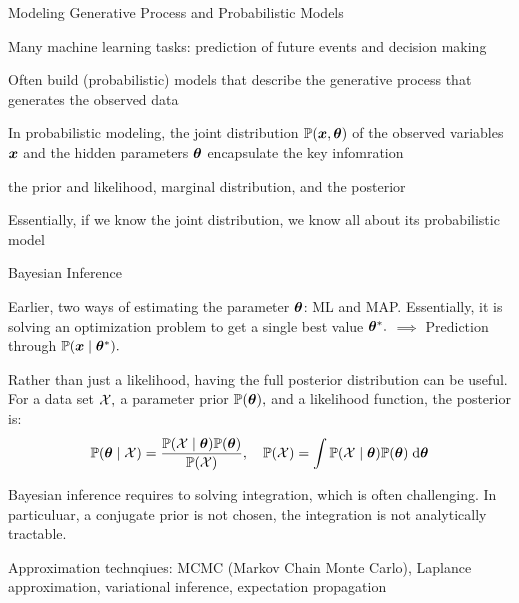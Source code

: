 \documentclass[handout,fleqn,aspectratio=169]{beamer}
\begin{document}
\begin{frame}{Modeling Generative Process and Probabilistic Models}

\plitemsep 0.2in

\bci 

\item Many machine learning tasks: prediction of future events and decision making

\item Often build (probabilistic) models that describe the generative process that generates the observed data

\item In probabilistic modeling, the joint distribution $\mathbb{P}( \bm{x},\bm{\theta} )$ of the observed variables 
$\bm{x}$ and the hidden parameters $\bm{\theta}$ encapsulate the key infomration
\bci
\item the prior and likelihood, marginal distribution, and the posterior 
\eci

\item Essentially, if we know the joint distribution, we know all about its probabilistic model
\eci
\end{frame}

\begin{frame}{Bayesian Inference}

\plitemsep 0.05in

\bci 

\item Earlier, two ways of estimating the parameter $\bm{\theta}$: ML and MAP. Essentially, it is solving an optimization problem to get a single best value $\bm{\theta}^*.$ $\implies$ Prediction through $\mathbb{P}( \bm{x} \mid \bm{\theta}^* ).$

\item Rather than just a likelihood, having the full posterior distribution can be useful. For a data set $\mathcal X,$ a parameter prior $\mathbb{P}( \bm{\theta} ),$ and a likelihood function, the posterior is:
$$
\mathbb{P}( \bm{\theta} \mid \mathcal X ) = \frac{\mathbb{P}( \mathcal X \mid \bm{\theta} ) \mathbb{P}( \bm{\theta} )}{\mathbb{P}( \mathcal X )}, \quad 
\mathbb{P}( \mathcal X ) = \int \mathbb{P}( \mathcal X \mid \bm{\theta} ) \mathbb{P}( \bm{\theta} ) \; \text{d}\bm{\theta}
$$

\item \question {}

\item Bayesian inference requires to solving integration, which is often challenging. In particuluar, a conjugate prior is not chosen, the integration is not analytically tractable.

\item Approximation technqiues: MCMC (Markov Chain Monte Carlo), Laplance approximation, variational inference, expectation propagation
\eci
\end{frame}
\end{document}
